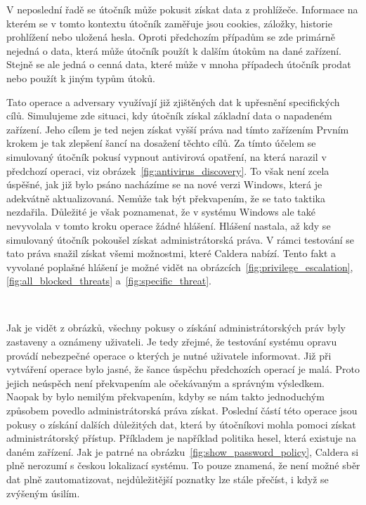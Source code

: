 
V neposlední řadě se útočník může pokusit získat data z prohlížeče.
Informace na kterém se v tomto kontextu útočník zaměřuje jsou cookies, záložky, historie prohlížení nebo uložená hesla.
Oproti předchozím případům se zde primárně nejedná o data, která může útočník použít k dalším útokům na dané zařízení.
Stejně se ale jedná o cenná data, které může v mnoha případech útočník prodat nebo použít k jiným typům útoků.

Tato operace a adversary využívají již zjištěných dat k upřesnění specifických cílů.
Simulujeme zde situaci, kdy útočník získal základní data o napadeném zařízení.
Jeho cílem je ted nejen získat vyšší práva nad tímto zařízením
Prvním krokem je tak zlepšení šancí na dosažení těchto cílů.
Za tímto účelem se simulovaný útočník pokusí vypnout antivirová opatření, na která narazil v předchozí operaci, viz obrázek~\ref{fig:antivirus_discovery}.
To však není zcela úspěšné, jak již bylo psáno nacházíme se na nové verzi Windows, která je adekvátně aktualizovaná.
Nemůže tak být překvapením, že se tato taktika nezdařila.
Důležité je však poznamenat, že v systému Windows ale také nevyvolala v tomto kroku operace žádné hlášení.
Hlášení nastala, až kdy se simulovaný útočník pokoušel získat administrátorská práva.
V rámci testování se tato práva snažil získat všemi možnostmi, které Caldera nabízí.
Tento fakt a vyvolané poplašné hlášení je možné vidět na obrázcích~\ref{fig:privilege_escalation},\ref{fig:all_blocked_threats} a~\ref{fig:specific_threat}.%

~
~
~

Jak je vidět z obrázků, všechny pokusy o získání administrátorských práv byly zastaveny a oznámeny uživateli.
Je tedy zřejmé, že testování systému opravu provádí nebezpečné operace o kterých je nutné uživatele informovat.
Již při vytváření operace bylo jasné, že šance úspěchu předchozích operací je malá.
Proto jejich neúspěch není překvapením ale očekávaným a správným výsledkem.
Naopak by bylo nemilým překvapením, kdyby se nám takto jednoduchým způsobem povedlo administrátorská práva získat.
Poslední částí této operace jsou pokusy o získání dalších důležitých dat, která by útočníkovi mohla pomoci získat administrátorský přístup.
Příkladem je například politika hesel, která existuje na daném zařízení.
Jak je patrné na obrázku~\ref{fig:show_password_policy}, Caldera si plně nerozumí s českou lokalizací systému.
To pouze znamená, že není možné sběr dat plně zautomatizovat, nejdůležitější poznatky lze stále přečíst, i když se zvýšeným úsilím.

